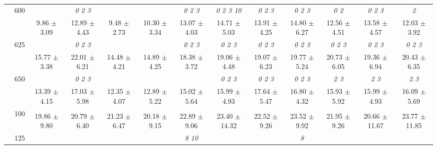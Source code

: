 \begin{table}[h]
{\begin{tabular}{
        ccccccccccccc}
 & \multirow{2}{*}{600}& & \textit{ 0 2 3 }& & & \textit{ 0 2 3 }& \textit{  0  2  3 10 }& \textit{ 0 2 3 }& \textit{ 0 2 3 }& \textit{ 0 2 }& \textit{ 0 2 3 }& \textit{ 2 } \\ 
 & & 9.86 $\pm$ 3.09& 12.89 $\pm$ 4.43& 9.48 $\pm$ 2.73& 10.30 $\pm$ 3.34& 13.07 $\pm$ 4.03& 14.71 $\pm$ 5.03& 13.91 $\pm$ 4.25& 14.80 $\pm$ 6.27& 12.56 $\pm$ 4.51& 13.58 $\pm$ 4.57& 12.03 $\pm$ 3.92 \\ 
 & \multirow{2}{*}{625}& \cellcolor[HTML]{EFEFEF} & \cellcolor[HTML]{EFEFEF} \textit{ 0 2 3 }& \cellcolor[HTML]{EFEFEF} & \cellcolor[HTML]{EFEFEF} & \cellcolor[HTML]{EFEFEF} \textit{ 0 2 3 }& \cellcolor[HTML]{EFEFEF} \textit{ 0 2 3 }& \cellcolor[HTML]{EFEFEF} \textit{ 0 2 3 }& \cellcolor[HTML]{EFEFEF} \textit{ 0 2 3 }& \cellcolor[HTML]{EFEFEF} \textit{ 0 2 3 }& \cellcolor[HTML]{EFEFEF} \textit{ 0 2 3 }& \cellcolor[HTML]{EFEFEF} \textit{ 0 2 3 } \\ 
 & & \cellcolor[HTML]{EFEFEF} 15.77 $\pm$ 3.38& \cellcolor[HTML]{EFEFEF} 22.01 $\pm$ 6.21& \cellcolor[HTML]{EFEFEF} 14.48 $\pm$ 4.21& \cellcolor[HTML]{EFEFEF} 14.89 $\pm$ 4.25& \cellcolor[HTML]{EFEFEF} 18.38 $\pm$ 3.72& \cellcolor[HTML]{EFEFEF} 19.06 $\pm$ 4.48& \cellcolor[HTML]{EFEFEF} 19.07 $\pm$ 6.23& \cellcolor[HTML]{EFEFEF} 19.77 $\pm$ 5.24& \cellcolor[HTML]{EFEFEF} 20.73 $\pm$ 6.05& \cellcolor[HTML]{EFEFEF} 19.36 $\pm$ 6.94& \cellcolor[HTML]{EFEFEF} 20.43 $\pm$ 6.35 \\ 
 & \multirow{2}{*}{650}& & \textit{ 0 2 3 }& & & & \textit{ 0 2 3 }& \textit{ 0 2 3 }& \textit{ 0 2 3 }& \textit{ 2 3 }& \textit{ 2 3 }& \textit{ 2 3 } \\ 
 & & 13.39 $\pm$ 4.15& 17.03 $\pm$ 5.98& 12.35 $\pm$ 4.07& 12.89 $\pm$ 5.22& 15.02 $\pm$ 5.64& 15.99 $\pm$ 4.93& 17.64 $\pm$ 5.47& 16.80 $\pm$ 4.32& 15.93 $\pm$ 5.92& 15.99 $\pm$ 4.93& 16.09 $\pm$ 5.69 \\ \midrule 
 & \multirow{2}{*}{100}& & & & & & & & & & &  \\ 
 & & 19.86 $\pm$ 9.80& 20.79 $\pm$ 6.40& 21.23 $\pm$ 6.47& 20.18 $\pm$ 9.15& 22.89 $\pm$ 9.06& 23.40 $\pm$ 14.32& 22.52 $\pm$ 9.26& 23.52 $\pm$ 9.92& 21.95 $\pm$ 9.26& 20.66 $\pm$ 11.67& 23.77 $\pm$ 11.85 \\ 
 & \multirow{2}{*}{125}& \cellcolor[HTML]{EFEFEF} & \cellcolor[HTML]{EFEFEF} & \cellcolor[HTML]{EFEFEF} & \cellcolor[HTML]{EFEFEF} & \cellcolor[HTML]{EFEFEF} \textit{  8 10 }& \cellcolor[HTML]{EFEFEF} & \cellcolor[HTML]{EFEFEF} & \cellcolor[HTML]{EFEFEF} \textit{ 8 }& \cellcolor[HTML]{EFEFEF} & \cellcolor[HTML]{EFEFEF} & \cellcolor[HTML]{EFEFEF}  \\ 

\end{tabular}}
\end{table}
